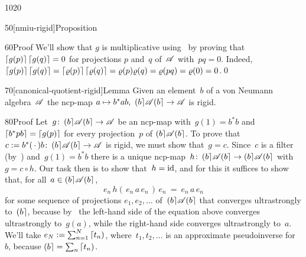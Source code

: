\begin{parsec}{1020}
\begin{point}{50}[nmiu-rigid]{Proposition}
\begin{point}{60}{Proof}
We'll show that $g$ is multiplicative
using~
by proving that
$\left\lceil g(p)\right\rceil\left\lceil g(q)\right\rceil=0$
for projections $p$ and~$q$ of~$\mathscr{A}$
with~$pq=0$.
Indeed,
$\left\lceil g(p)\right\rceil\left\lceil g(q)\right\rceil=\left\lceil\varrho(p)\right\rceil\left\lceil\varrho(q)\right\rceil
=\varrho(p)\varrho(q)=\varrho(pq)=\varrho(0)=0$.\qed
\end{point}
\end{point}
\begin{point}{70}[canonical-quotient-rigid]{Lemma}%
Given an element~$b$ of a von Neumann algebra~$\mathscr{A}$
the ncp-map $a\mapsto b^* a b,\ \ceilr{b}\!\scrA\!\ceilr{b}\to\scrA$
is rigid.
\begin{point}{80}{Proof}%
Let~$g\colon \left(b\right\rceil\!\mathscr{A}\!\left(b\right\rceil\to\mathscr{A}$
be an ncp-map with~$g(1)=b^*b$
and $\left\lceil b^*pb\right\rceil=\left\lceil g(p)\right\rceil$ for every projection~$p$ 
of $\left(b\right\rceil\!\mathscr{A}\!\left(b\right\rceil$.
To prove that~$c:=b^*(\,\cdot\,) b
\colon \left(b\right\rceil\!\mathscr{A}\!\left(b\right\rceil\to \mathscr{A}$ is rigid,
we must show that~$g=c$.
Since~$c$ is a filter
(by~)
and~$g(1)=b^*b$
there is a unique ncp-map~$h\colon \left(b\right\rceil\!\mathscr{A}\!\left(b\right\rceil
\to\left(b\right\rceil\!\mathscr{A}\!\left(b\right\rceil$
with~$g=c\circ h$.
Our task then is to show that~$h=\mathrm{id}$,
and for this it suffices to show that,
for all~$a\in\left(b\right\rceil\!\mathscr{A}\!\left(b\right\rceil$,
\begin{equation}
\label{filter-rigid-1}
e_n\, h(\,e_n\, a\, e_n\,)\, e_n
\ = \ e_n \, a\,  e_n
\end{equation}
for some sequence of projections $e_1,e_2,\dotsc$
of~$\left(b\right\rceil\!\mathscr{A}\!\left(b\right\rceil$
that converges ultrastrongly to~$\left(b\right\rceil$,
because by~ the left-hand side of the equation above 
converges ultrastrongly to~$g(a)$,
while the right-hand side converges ultrastrongly to~$a$.
We'll take $e_N := \sum_{n=1}^N \left\lceil t_n\right)$,
where~$t_1,t_2,\dotsc$
is an approximate pseudoinverse for~$b$,
because $\left(b\right\rceil = \sum_n\left\lceil t_n\right)$.


\end{point}
\end{point}
\end{parsec}
